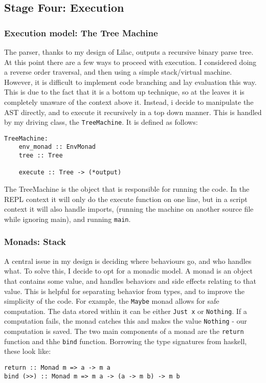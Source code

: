 \documentclass[a4paper, 12pt]{article}
\begin{document}
\subsection{Stage Four: Execution}\label{sec:stage-four-execution}
\subsubsection{Execution model: The Tree Machine}\label{sec:execution-model-the-tree-machine}
The parser, thanks to my design of Lilac, outputs a recursive binary parse tree. At this point there are a few ways to proceed with execution. I considered doing a reverse order traversal, and then using a simple stack/virtual machine. However, it is difficult to implement code branching and lay evaluation this way. This is due to the fact that it is a bottom up technique, so at the leaves it is completely unaware of the context above it. Instead, i decide to manipulate the AST directly, and to execute it recursively in a top down manner. This is handled by my driving class, the \verb|TreeMachine|. It is defined as follows:\\
\begin{verbatim}
TreeMachine:
    env_monad :: EnvMonad
    tree :: Tree
    
    execute :: Tree -> (*output)
\end{verbatim}

The TreeMachine is the object that is responsible for running the code. In the REPL context it will only do the execute function on one line, but in a script context it will also handle imports, (running the machine on another source file while ignoring main), and running \verb|main|.\\

\subsubsection{Monads: Stack}\label{sec:monads-stack}
A central issue in my design is deciding where behaviours go, and who handles what. To solve this, I decide to opt for a monadic model. A monad is an object that contains some value, and handles behaviors and side effects relating to that value. This is helpful for separating behavior from types, and to improve the simplicity of the code. For example, the \verb|Maybe| monad allows for safe computation. The data stored within it can be either \verb|Just x| or \verb|Nothing|. If a computation fails, the monad catches this and makes the value \verb|Nothing| - our computation is saved. The two main components of a monad are the \verb|return| function and thhe \verb|bind| function. Borrowing the type signatures from haskell, these look like:
\begin{verbatim}
return :: Monad m => a -> m a
bind (>>) :: Monad m => m a -> (a -> m b) -> m b
\end{verbatim}
\end{document}

